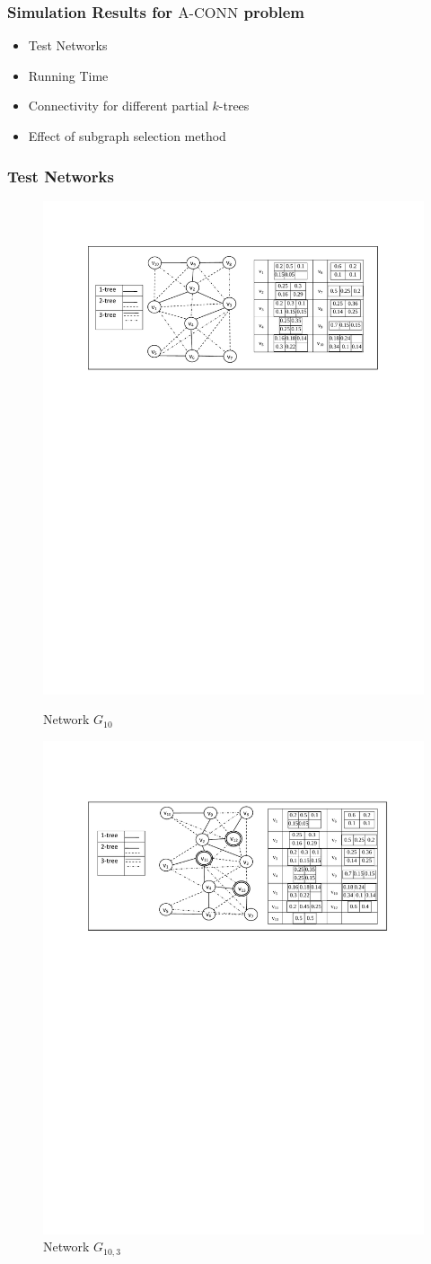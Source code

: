 \documentclass{beamer}
\newcommand{\ACONN}   { {\mathrm {A\mbox{-}CONN}} }
\begin{document}
\begin{frame}
\frametitle{Simulation Results for $\ACONN$ problem}

\begin{itemize}
\item Test Networks
\item Running Time
\item Connectivity for different partial $k$-trees
\item Effect of subgraph selection method
\end{itemize}
\end{frame}
\begin{frame}
\frametitle{Test Networks}
\vspace{-0.5em}
\begin{figure}[!htb]
\begin{minipage}{.8\linewidth}
\includegraphics[width=4 in, height=1.2 in]{NetworkI_paper.pdf}
\caption{Network $G_{10}$}
\label{fig:netI1}
\end{minipage}
\begin{minipage}{.8\linewidth}
\includegraphics[width=4 in, height=1.2 in]{NetworkI_paper_Relay.pdf}
\vspace{-0.7 cm}
\caption{Network $G_{10,3}$}
\label{fig:netIR}
\end{minipage}
\end{figure}

\end{frame}

\end{document}
